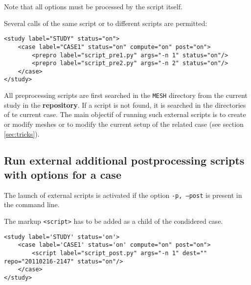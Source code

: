 \documentclass[a4paper,10pt,twoside]{csshortdoc}
\begin{document}
Note that all options must be processed by the script itself.

Several calls of the same script or to different scripts are permitted:
\small
\begin{verbatim}
<study label="STUDY" status="on">
    <case label="CASE1" status="on" compute="on" post="on">
        <prepro label="script_pre1.py" args="-n 1" status="on"/>
        <prepro label="script_pre2.py" args="-n 2" status="on"/>
    </case>
</study>
\end{verbatim}
\normalsize

All preprocessing scripts are first searched in the \texttt{MESH} directory
from the current study in the \textbf{repository}. If a script is not found,
it is searched in the directories of te current case.
The main objectif of running such external scripts is to create or modify
meshes or to modify the current setup of the related case (see section
\ref{sec:tricks}).

\subsection{Run external additional postprocessing scripts with options for a case}

The launch of external scripts is activated if the option \texttt{-p, --post}
is present in the command line.

The markup \texttt{<script>} has to be added as a child of the condidered case.

\small
\begin{verbatim}
<study label='STUDY' status='on'>
    <case label='CASE1' status='on' compute="on" post="on">
        <script label="script_post.py" args="-n 1" dest="" repo="20110216-2147" status="on"/>
    </case>
</study>
\end{verbatim}
\normalsize
\end{document}
